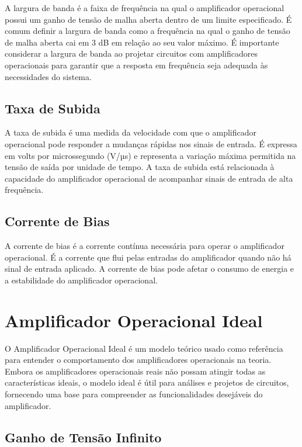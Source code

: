 \documentclass[12pt,twoside, a4paper, twocolumn]{article}
\begin{document}
A largura de banda é a faixa de frequência na qual o amplificador operacional possui um ganho de tensão de malha aberta dentro de um limite especificado. É comum definir a largura de banda como a frequência na qual o ganho de tensão de malha aberta cai em 3 dB em relação ao seu valor máximo. É importante considerar a largura de banda ao projetar circuitos com amplificadores operacionais para garantir que a resposta em frequência seja adequada às necessidades do sistema.


\subsection{Taxa de Subida}


A taxa de subida é uma medida da velocidade com que o amplificador operacional pode responder a mudanças rápidas nos sinais de entrada. É expressa em volts por microssegundo (V/µs) e representa a variação máxima permitida na tensão de saída por unidade de tempo. A taxa de subida está relacionada à capacidade do amplificador operacional de acompanhar sinais de entrada de alta frequência.


\subsection{Corrente de Bias}


A corrente de bias é a corrente contínua necessária para operar o amplificador operacional. É a corrente que flui pelas entradas do amplificador quando não há sinal de entrada aplicado. A corrente de bias pode afetar o consumo de energia e a estabilidade do amplificador operacional.


\section{Amplificador Operacional Ideal}


O Amplificador Operacional Ideal é um modelo teórico usado como referência para entender o comportamento dos amplificadores operacionais na teoria. Embora os amplificadores operacionais reais não possam atingir todas as características ideais, o modelo ideal é útil para análises e projetos de circuitos, fornecendo uma base para compreender as funcionalidades desejáveis do amplificador.


\subsection{Ganho de Tensão Infinito}
\end{document}
